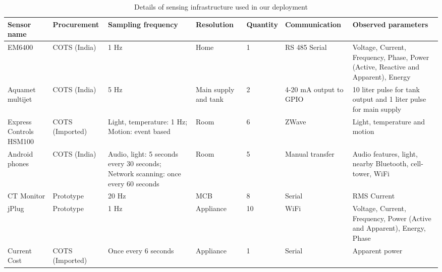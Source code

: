 \documentclass[10pt]{sensys-proc}
\begin{document}
\begin{table}[t!]
\footnotesize
\centering
\vspace{-4mm}
\caption{Details of sensing infrastructure used in our deployment}
\vspace{-4mm}
\label{tab:sensing}
\tabcolsep=0.015cm
\begin{center}
\begin{tabular}{|p{1.7cm}|p{2.0cm}|p{3.3cm}|p{1.5cm}|p{1.5cm}|p{2.0cm}|p{5.2cm}|}
\hline
\textbf{Sensor name} & \textbf{Procurement} & \textbf{Sampling frequency} & \textbf{Resolution} & \textbf{Quantity} & \textbf{Communication} & \textbf{Observed parameters}\\
\hline

EM6400& COTS (India)&1 Hz&Home&1&RS 485 Serial&Voltage, Current, Frequency, Phase, Power (Active, Reactive and Apparent), Energy\\ \hline
Aquamet multijet & COTS (India) &5 Hz&Main supply and tank&2&4-20 mA output to GPIO &10 liter pulse for tank output and 1 liter pulse for main supply\\ \hline
Express Controls HSM100 &COTS (Imported)&Light, temperature: 1 Hz; Motion: event based &Room &6&ZWave&Light, temperature and motion\\ \hline
Android phones &COTS (India) & Audio, light: 5 seconds every 30 seconds; Network scanning: once every 60 seconds&Room&5&Manual transfer&Audio features, light, nearby Bluetooth, cell-tower, WiFi\\ \hline
CT Monitor&Prototype &20 Hz&MCB&8&Serial&RMS Current \\\hline
jPlug& Prototype &1 Hz &Appliance&10&WiFi&Voltage, Current, Frequency, Power (Active and Apparent), Energy, Phase\\ \hline	
Current Cost&COTS (Imported)& Once every 6 seconds &Appliance&1&Serial&Apparent power\\ \hline
\end{tabular}
\end{center}
\vspace{-4mm}
\end{table}
\end{document}

